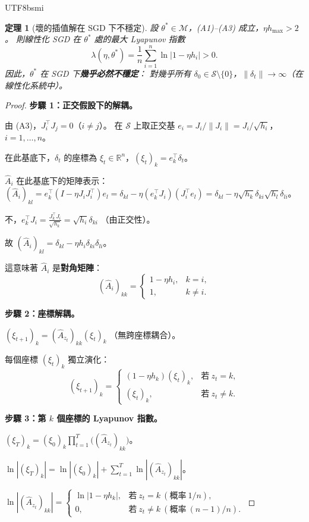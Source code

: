 \documentclass[11pt,a4paper]{article}
\newtheorem{theorem}{定理}
\theoremstyle{definition}
\newcommand{\R}{\mathbb{R}}
\newcommand{\cM}{\mathcal{M}}
\newcommand{\cS}{\mathcal{S}}
\begin{document}
\begin{CJK}{UTF8}{bsmi}
\begin{theorem}[壞的插值解在 SGD 下不穩定]\label{thm:A}
  設 $\theta^*\in\cM$，(A1)--(A3) 成立，$\eta h_{\max}>2$。
  則線性化 SGD 在 $\theta^*$ 處的最大 Lyapunov 指數
  \[
    \lambda(\eta,\theta^*) = \frac{1}{n}\sum_{i=1}^n \ln|1-\eta h_i| > 0.
  \]
  因此，$\theta^*$ 在 SGD 下\textbf{幾乎必然不穩定}：
  對幾乎所有 $\delta_0\in\cS\setminus\{0\}$，$\|\delta_t\|\to\infty$（在線性化系統中）。
\end{theorem}

\begin{proof}
  \textbf{步驟 1：正交假設下的解耦。}

  由 (A3)，$J_i^\top J_j=0$（$i\neq j$）。
  在 $\cS$ 上取正交基 $e_i=J_i/\|J_i\|=J_i/\sqrt{h_i}$，$i=1,\ldots,n$。

  在此基底下，$\delta_t$ 的座標為 $\xi_t\in\R^n$，$(\xi_t)_k=e_k^\top\delta_t$。

  $\hat{A}_i$ 在此基底下的矩陣表示：
  $(\hat{A}_i)_{kl}=e_k^\top(I-\eta J_iJ_i^\top)e_l
  =\delta_{kl}-\eta(e_k^\top J_i)(J_i^\top e_l)
  =\delta_{kl}-\eta\sqrt{h_k}\delta_{ki}\sqrt{h_l}\delta_{li}$。

  不，$e_k^\top J_i = \frac{J_k^\top J_i}{\sqrt{h_k}}=\sqrt{h_i}\delta_{ki}$
  （由正交性）。

  故 $(\hat{A}_i)_{kl}=\delta_{kl}-\eta h_i\delta_{ki}\delta_{li}$。

  這意味著 $\hat{A}_i$ 是\textbf{對角矩陣}：
  \[
    (\hat{A}_i)_{kk}=\begin{cases}1-\eta h_i,&k=i,\\1,&k\neq i.\end{cases}
  \]

  \textbf{步驟 2：座標解耦。}

  $(\xi_{t+1})_k=(\hat{A}_{z_t})_{kk}(\xi_t)_k$
  （無跨座標耦合）。

  每個座標 $(\xi_t)_k$ 獨立演化：
  \[
    (\xi_{t+1})_k = \begin{cases}(1-\eta h_k)(\xi_t)_k,&\text{若}~z_t=k,\\(\xi_t)_k,&\text{若}~z_t\neq k.\end{cases}
  \]

  \textbf{步驟 3：第 $k$ 個座標的 Lyapunov 指數。}

  $(\xi_T)_k=(\xi_0)_k\prod_{t=1}^T \bigl((\hat{A}_{z_t})_{kk}\bigr)$。

  $\ln|(\xi_T)_k|=\ln|(\xi_0)_k|+\sum_{t=1}^T \ln|(\hat{A}_{z_t})_{kk}|$。

  $\ln|(\hat{A}_{z_t})_{kk}|=\begin{cases}\ln|1-\eta h_k|,&\text{若}~z_t=k~(\text{概率}~1/n),\\0,&\text{若}~z_t\neq k~(\text{概率}~(n-1)/n).\end{cases}$


\end{proof}
\end{CJK}
\end{document}
